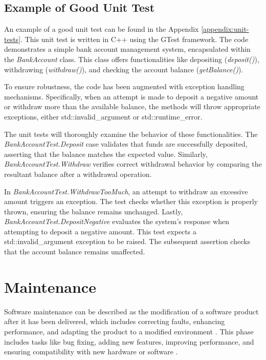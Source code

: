 \subsection{Example of Good Unit Test}
\label{subsection:example_of_good_unit_test}

An example of a good unit test can be found in the Appendix \ref{appendix:unit-tests}. This unit test is written in C++ using the GTest framework. The code  demonstrates a simple bank account management system, encapsulated within the \textit{BankAccount} class. This class offers functionalities like depositing (\textit{deposit()}), withdrawing (\textit{withdraw()}), and checking the account balance (\textit{getBalance()}).

To ensure robustness, the code has been augmented with exception handling mechanisms. Specifically, when an attempt is made to deposit a negative amount or withdraw more than the available balance, the methods will throw appropriate exceptions, either std::invalid\_argument or std::runtime\_error.

The unit tests will thoroughly examine the behavior of these functionalities. The \textit{BankAccountTest.Deposit} case validates that funds are successfully deposited, asserting that the balance matches the expected value. Similarly, \textit{{BankAccountTest.Withdraw}} verifies correct withdrawal behavior by comparing the resultant balance after a withdrawal operation.

In \textit{BankAccountTest.WithdrawTooMuch}, an attempt to withdraw an excessive amount triggers an exception. The test checks whether this exception is properly thrown, ensuring the balance remains unchanged. Lastly, \textit{BankAccountTest.DepositNegative} evaluates the system's response when attempting to deposit a negative amount. This test expects a std::invalid\_argument exception to be raised. The subsequent assertion checks that the account balance remains unaffected.

\section{Maintenance}

Software maintenance can be described as the modification of a software product after it has been delivered, which includes correcting faults, enhancing performance, and adapting the product to a modified environment \cite{Bhatt04}. This phase includes tasks like bug fixing, adding new features, improving performance, and ensuring compatibility with new hardware or software \cite{geeksforgeeks_2023b}.

